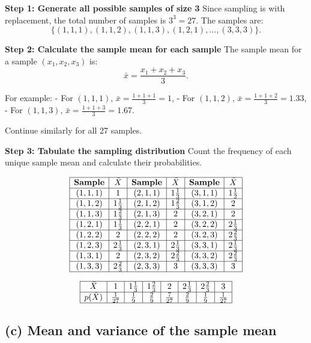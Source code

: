 \documentclass{article}
\begin{document}
\textbf{Step 1: Generate all possible samples of size 3}  
Since sampling is with replacement, the total number of samples is $3^3 = 27$. The samples are:
\[
\{(1,1,1), (1,1,2), (1,1,3), (1,2,1), \dots, (3,3,3)\}.
\]

\textbf{Step 2: Calculate the sample mean for each sample}  
The sample mean for a sample $(x_1, x_2, x_3)$ is:
\[
\bar{x} = \frac{x_1 + x_2 + x_3}{3}.
\]

For example:
- For $(1, 1, 1)$, $\bar{x} = \frac{1 + 1 + 1}{3} = 1$,
- For $(1, 1, 2)$, $\bar{x} = \frac{1 + 1 + 2}{3} = 1.33$,
- For $(1, 1, 3)$, $\bar{x} = \frac{1 + 1 + 3}{3} = 1.67$.

Continue similarly for all 27 samples.

\textbf{Step 3: Tabulate the sampling distribution}  
Count the frequency of each unique sample mean and calculate their probabilities.

\[
\begin{array}{|c|c|c|c|c|c|c|}
\hline
\textbf{Sample} & \bar{X} & \textbf{Sample} & \bar{X} & \textbf{Sample} & \bar{X} \\ \hline
(1,1,1) & 1 & (2,1,1) & 1\frac{1}{3} & (3,1,1) & 1\frac{1}{2} \\ \hline
(1,1,2) & 1\frac{1}{3} & (2,1,2) & 1\frac{2}{3} & (3,1,2) & 2 \\ \hline
(1,1,3) & 1\frac{2}{3} & (2,1,3) & 2 & (3,2,1) & 2 \\ \hline
(1,2,1) & 1\frac{1}{3} & (2,2,1) & 2 & (3,2,2) & 2\frac{1}{3} \\ \hline
(1,2,2) & 2 & (2,2,2) & 2 & (3,2,3) & 2\frac{2}{3} \\ \hline
(1,2,3) & 2\frac{1}{3} & (2,3,1) & 2\frac{1}{3} & (3,3,1) & 2\frac{1}{3} \\ \hline
(1,3,1) & 2 & (2,3,2) & 2\frac{2}{3} & (3,3,2) & 2\frac{2}{3} \\ \hline
(1,3,3) & 2\frac{2}{3} & (2,3,3) & 3 & (3,3,3) & 3 \\ \hline
\end{array}
\]

\[
\begin{array}{|c|c|c|c|c|c|c|c|}
\hline
\bar{X} & 1 & 1\frac{1}{3} & 1\frac{2}{3} & 2 & 2\frac{1}{3} & 2\frac{2}{3} & 3 \\ \hline
p(\bar{X}) & \frac{1}{27} & \frac{1}{9} & \frac{2}{9} & \frac{7}{27} & \frac{2}{9} & \frac{1}{9} & \frac{1}{27} \\ \hline
\end{array}
\]


\subsection*{(c) Mean and variance of the sample mean}
\end{document}
